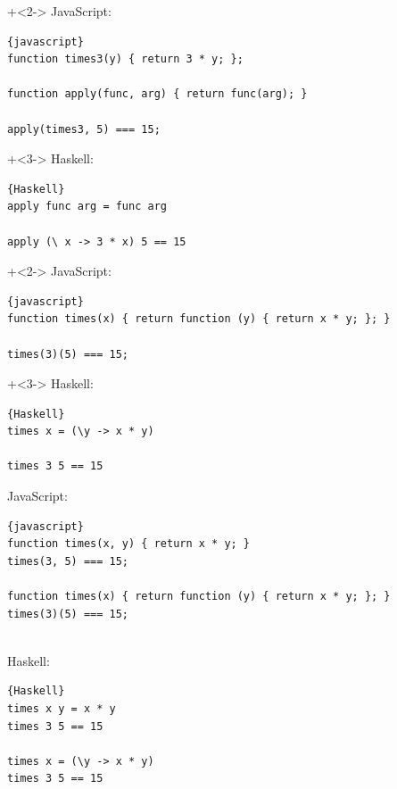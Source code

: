 \begin{frame}[fragile]{}
\onslide+<2->
JavaScript:
\begin{lstlisting}{javascript}
function times3(y) { return 3 * y; };

function apply(func, arg) { return func(arg); }

apply(times3, 5) === 15;
\end{lstlisting}

\onslide+<3->
Haskell:
\begin{lstlisting}{Haskell}
apply func arg = func arg

apply (\ x -> 3 * x) 5 == 15
\end{lstlisting}

\end{frame}

\begin{frame}[fragile]{}
\onslide+<2->
JavaScript:
\begin{lstlisting}{javascript}
function times(x) { return function (y) { return x * y; }; }

times(3)(5) === 15;
\end{lstlisting}

\onslide+<3->
Haskell:
\begin{lstlisting}{Haskell}
times x = (\y -> x * y)

times 3 5 == 15
\end{lstlisting}

\end{frame}

\begin{frame}[fragile]{}
JavaScript: 
\begin{lstlisting}{javascript}
function times(x, y) { return x * y; }
times(3, 5) === 15;

function times(x) { return function (y) { return x * y; }; }
times(3)(5) === 15;
\end{lstlisting}
~\\
Haskell: 
\begin{lstlisting}{Haskell}
times x y = x * y
times 3 5 == 15

times x = (\y -> x * y)
times 3 5 == 15
\end{lstlisting}

\end{frame}

